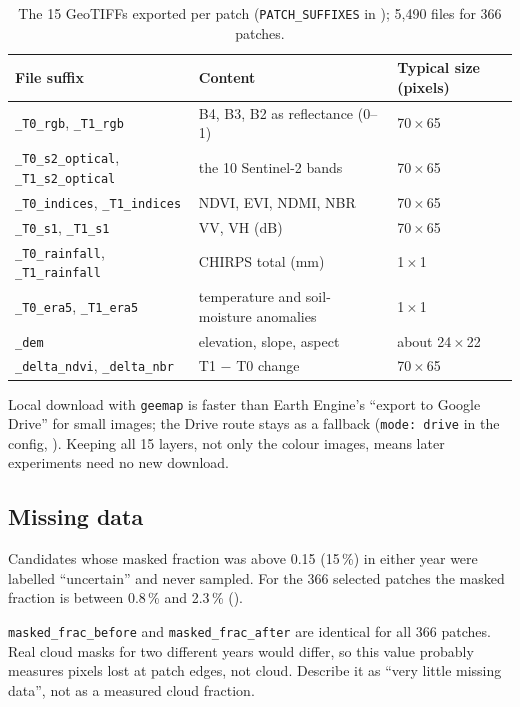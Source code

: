 \begin{table}[H]
\centering
\caption{The 15 GeoTIFFs exported per patch (\texttt{PATCH\_SUFFIXES} in ); 5,490 files for 366 patches.}
\label{tab:15files}
\small
\begin{tabular}{lll}
\toprule
File suffix & Content & Typical size (pixels) \\
\midrule
\texttt{\_T0\_rgb}, \texttt{\_T1\_rgb} & B4, B3, B2 as reflectance (0--1) & 70\,$\times$\,65 \\
\texttt{\_T0\_s2\_optical}, \texttt{\_T1\_s2\_optical} & the 10 Sentinel-2 bands & 70\,$\times$\,65 \\
\texttt{\_T0\_indices}, \texttt{\_T1\_indices} & NDVI, EVI, NDMI, NBR & 70\,$\times$\,65 \\
\texttt{\_T0\_s1}, \texttt{\_T1\_s1} & VV, VH (dB) & 70\,$\times$\,65 \\
\texttt{\_T0\_rainfall}, \texttt{\_T1\_rainfall} & CHIRPS total (mm) & 1\,$\times$\,1 \\
\texttt{\_T0\_era5}, \texttt{\_T1\_era5} & temperature and soil-moisture anomalies & 1\,$\times$\,1 \\
\texttt{\_dem} & elevation, slope, aspect & about 24\,$\times$\,22 \\
\texttt{\_delta\_ndvi}, \texttt{\_delta\_nbr} & T1 $-$ T0 change & 70\,$\times$\,65 \\
\bottomrule
\end{tabular}
\end{table}

\begin{whybox}
Local download with \texttt{geemap} is faster than Earth Engine's ``export to Google Drive'' for small images; the Drive route stays as a fallback (\texttt{mode: drive} in the config, ). Keeping all 15 layers, not only the colour images, means later experiments need no new download.
\end{whybox}

\subsection{Missing data}

Candidates whose masked fraction was above 0.15 (15\,\%) in either year were labelled ``uncertain'' and never sampled. For the 366 selected patches the masked fraction is between 0.8\,\% and 2.3\,\% ().

\begin{watchout}
\texttt{masked\_frac\_before} and \texttt{masked\_frac\_after} are identical for all 366 patches. Real cloud masks for two different years would differ, so this value probably measures pixels lost at patch edges, not cloud. Describe it as ``very little missing data'', not as a measured cloud fraction.
\end{watchout}


